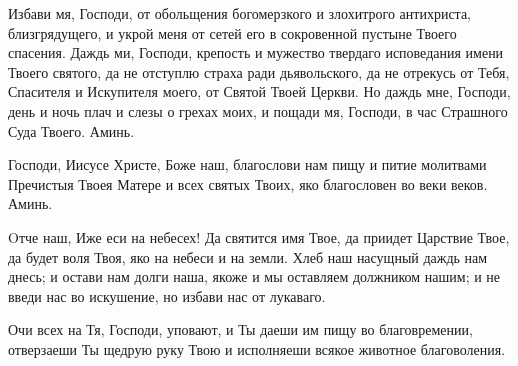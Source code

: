 \mychapterending


\begin{mymulticols}







Избави мя, Господи, от обольщения богомерзкого и злохитрого антихриста, близгрядущего, и укрой меня от сетей его в сокровенной пустыне Твоего спасения. Даждь ми, Господи, крепость и мужество твердаго исповедания имени Твоего святого, да не отступлю страха ради дьявольского, да не отрекусь от Тебя, Спасителя и Искупителя моего, от Святой Твоей Церкви. Но даждь мне, Господи, день и ночь плач и слезы о грехах моих, и пощади мя, Господи, в час Страшного Суда Твоего. Аминь.


\myemph{ }




\end{mymulticols}

\mychapterending


\begin{mymulticols}




Господи, Иисусе Христе, Боже наш, благослови нам пищу и питие молитвами Пречистыя Твоея Матере и всех святых Твоих, яко благословен во веки веков. Аминь. 





\end{mymulticols}

\mychapterending


\begin{mymulticols}



Oтче наш, Иже еси на небесех! Да святится имя Твое, да приидет Царствие Твое, да будет воля Твоя, яко на небеси и на земли. Хлеб наш насущный даждь нам днесь; и остави нам долги наша, якоже и мы оставляем должником нашим; и не введи нас во искушение, но избави нас от лукаваго.


 Очи всех на Тя, Господи, уповают, и Ты даеши им пищу во благовремении, отверзаеши Ты щедрую руку Твою и исполняеши всякое животное благоволения.

\end{mymulticols}

